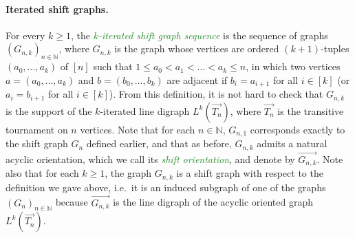\documentclass[11pt,a4aper]{article}
\newtheorem{lemma}[theorem]{Lemma}
\renewcommand{\le}{\leqslant}
\renewcommand{\geq}{\geqslant}
\DeclareRobustCommand*{\ora}{\overrightarrow}
\newcommand*{\orGnk}{\ora{G_{n,k}}}
\newcommand*{\orTn}{\ora{T_n}}
\newcommand{\defin}[1]{\emph{\textcolor{ForestGreen}{#1}}}
\newcommand{\ugo}[1]{{\color{red} UG: #1}}
\begin{document}

\paragraph{Iterated shift graphs.}
For every $k\geq 1$, the \defin{$k$-iterated shift graph sequence}
is the sequence of graphs $(G_{n,k})_{n\in \mathbb{N}}$, where $G_{n,k}$ is the graph whose vertices are
ordered $(k+1)$-tuples $(a_0, \ldots, a_k)$ of $[n]$ such that
$1 \le a_0 < a_1 < \ldots < a_k \le n$, in which two vertices
$a = (a_0, \ldots, a_k)$ and $b = (b_0, \ldots, b_k)$ are adjacent if
$b_i = a_{i+1}$ for all $i \in [k]$ (or $a_i = b_{i+1}$ for all
$i \in [k]$). From this definition, it is not hard to check that
$G_{n,k}$ is the support of the $k$-iterated line digraph $L^k(\orTn)$, where
$\orTn$ is the transitive tournament on $n$ vertices. Note that for each
$n\in \mathbb N$, $G_{n,1}$  corresponds exactly to the shift graph $G_n$ defined
earlier, and that as before, $G_{n,k}$ admits a natural acyclic orientation,
which we call its \defin{shift orientation}, and denote by $\orGnk$. Note also
that for each $k\geq 1$, the graph $G_{n,k}$ is a shift graph with respect to
the definition we gave above, i.e.\ it is an induced subgraph of one of the
graphs $(G_{n})_{n\in \mathbb{N}}$ because $\orGnk$ is the line digraph of the acyclic oriented
graph $L^{k}(\orTn)$.
 
\end{document}

